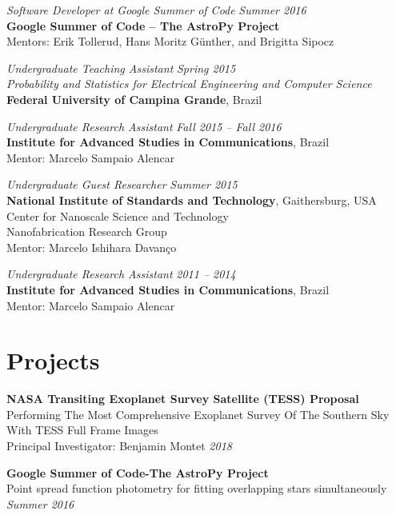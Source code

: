 \documentclass[10pt]{article}
\begin{document}
\begin{titlepage}
\emph{Software Developer at Google Summer of Code} \hfill \textit{Summer 2016}
\\\textbf{Google Summer of Code -- The AstroPy Project}
\\Mentors: Erik Tollerud, Hans Moritz G\"unther, and Brigitta Sipocz
\vspace{.5cm}

\emph{Undergraduate Teaching Assistant} \hfill \textit{Spring 2015}
\\\emph{Probability and Statistics for Electrical Engineering and Computer Science}
\\\textbf{Federal University of Campina Grande}, Brazil
\vspace{.5cm}

\emph{Undergraduate Research Assistant} \hfill \textit{Fall 2015 -- Fall 2016}
\\\textbf{Institute for Advanced Studies in Communications}, Brazil
\\Mentor: Marcelo Sampaio Alencar
\vspace{.5cm}

\emph{Undergraduate Guest Researcher} \hfill \textit{Summer 2015}
\\\textbf{National Institute of Standards and Technology}, Gaithersburg, USA
\\Center for Nanoscale Science and Technology
\\Nanofabrication Research Group
\\Mentor: Marcelo Ishihara Davan\c co
\vspace{.5cm}

\emph{Undergraduate Research Assistant} \hfill \textit{2011 -- 2014}
\\\textbf{Institute for Advanced Studies in Communications}, Brazil
\\Mentor: Marcelo Sampaio Alencar

\section*{Projects}
    \textbf{NASA Transiting Exoplanet Survey Satellite (TESS) Proposal}\\
    Performing The Most Comprehensive Exoplanet Survey Of The Southern Sky With TESS Full Frame Images\\
    Principal Investigator: Benjamin Montet
    \hfill \textit{2018}
    \vspace{.5cm}


    \textbf{Google Summer of Code-The AstroPy Project}\\
    Point spread function photometry for fitting overlapping stars simultaneously
    \hfill \textit{Summer 2016}
    \vspace{.5cm}


\end{titlepage}
\end{document}
